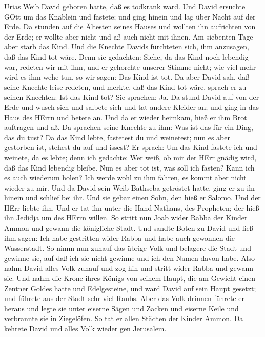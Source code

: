 Urias Weib David geboren hatte, daß es todkrank ward.  Und
David ersuchte GOtt um das Knäblein und fastete; und ging hinein und lag
über Nacht auf der Erde.  Da stunden auf die Ältesten
seines Hauses und wollten ihn aufrichten von der Erde; er wollte aber
nicht und aß auch nicht mit ihnen.  Am siebenten Tage aber
starb das Kind. Und die Knechte Davids fürchteten sich, ihm anzusagen,
daß das Kind tot wäre. Denn sie gedachten: Siehe, da das Kind noch
lebendig war, redeten wir mit ihm, und er gehorchte unserer Stimme
nicht; wie viel mehr wird es ihm wehe tun, so wir sagen: Das Kind ist
tot.  Da aber David sah, daß seine Knechte leise redeten,
und merkte, daß das Kind tot wäre, sprach er zu seinen Knechten: Ist das
Kind tot? Sie sprachen: Ja.  Da stund David auf von der
Erde und wusch sich und salbete sich und tat andere Kleider an; und ging
in das Haus des HErrn und betete an. Und da er wieder heimkam, hieß er
ihm Brot auftragen und aß.  Da sprachen seine Knechte zu
ihm: Was ist das für ein Ding, das du tust? Da das Kind lebte, fastetest
du und weinetest; nun es aber gestorben ist, stehest du auf und issest?
 Er sprach: Um das Kind fastete ich und weinete, da es
lebte; denn ich gedachte: Wer weiß, ob mir der HErr gnädig wird, daß das
Kind lebendig bleibe.  Nun es aber tot ist, was soll ich
fasten? Kann ich es auch wiederum holen? Ich werde wohl zu ihm fahren,
es kommt aber nicht wieder zu mir.  Und da David sein Weib
Bathseba getröstet hatte, ging er zu ihr hinein und schlief bei ihr. Und
sie gebar einen Sohn, den hieß er Salomo. Und der HErr liebte ihn.
 Und er tat ihn unter die Hand Nathans, des Propheten; der
hieß ihn Jedidja um des HErrn willen.  So stritt nun Joab
wider Rabba der Kinder Ammon und gewann die königliche Stadt.
 Und sandte Boten zu David und ließ ihm sagen: Ich habe
gestritten wider Rabba und habe auch gewonnen die Wasserstadt.
 So nimm nun zuhauf das übrige Volk und belagere die Stadt
und gewinne sie, auf daß ich sie nicht gewinne und ich den Namen davon
habe.  Also nahm David alles Volk zuhauf und zog hin und
stritt wider Rabba und gewann sie.  Und nahm die Krone
ihres Königs von seinem Haupt, die am Gewicht einen Zentner Goldes hatte
und Edelgesteine, und ward David auf sein Haupt gesetzt; und führete aus
der Stadt sehr viel Raubs.  Aber das Volk drinnen führete
er heraus und legte sie unter eiserne Sägen und Zacken und eiserne Keile
und verbrannte sie in Ziegelöfen. So tat er allen Städten der Kinder
Ammon. Da kehrete David und alles Volk wieder gen Jerusalem.

